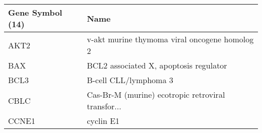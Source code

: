 \begin{tabular}{ll}
\toprule
Gene Symbol (14) &                                               Name \\
\midrule
            AKT2 &      v-akt murine thymoma viral oncogene homolog 2 \\
             BAX &             BCL2 associated X, apoptosis regulator \\
            BCL3 &                              B-cell CLL/lymphoma 3 \\
            CBLC & Cas-Br-M (murine) ecotropic retroviral transfor... \\
           CCNE1 &                                          cyclin E1 \\
\bottomrule
\end{tabular}
